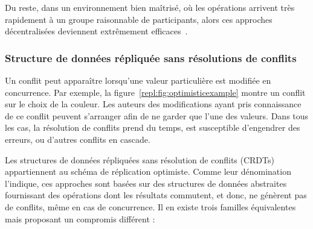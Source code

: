 \noindent Du reste, dans un environnement bien maîtrisé, où les opérations
arrivent très rapidement à un groupe raisonnable de participants, alors ces
approches décentralisées deviennent extrêmement
efficaces~\cite{mehdi2014merging}.




\subsubsection{Structure de données répliquée sans résolutions de conflits}
\label{repl:subsubsec:crdts}

Un conflit peut apparaître lorsqu'une valeur particulière est modifiée en
concurrence. Par exemple, la figure~\ref{repl:fig:optimisticexample} montre un
conflit sur le choix de la couleur. Les auteurs des modifications ayant pris
connaissance de ce conflit peuvent s'arranger afin de ne garder que l'une des
valeurs. Dans tous les cas, la résolution de conflits prend du temps, est
susceptible d'engendrer des erreurs, ou d'autres conflits en cascade.

Les structures de données répliquées sans résolution de conflits
(CRDTs)~\cite{shapiro2011comprehensive, shapiro2011conflict} appartiennent au
schéma de réplication optimiste. Comme leur dénomination l'indique, ces
approches sont basées sur des structures de données abstraites fournissant des
opérations dont les résultats commutent, et donc, ne génèrent pas de conflits,
même en cas de concurrence.  Il en existe trois familles équivalentes mais
proposant un compromis différent :

